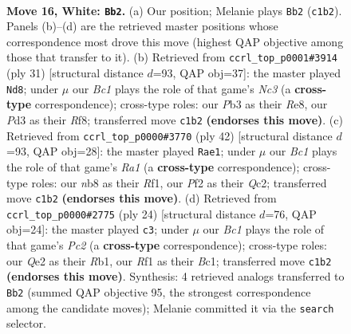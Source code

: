 \documentclass[11pt]{article}
\begin{document}
\clearpage

\begin{figure}[p]\centering
\begin{subfigure}{0.46\textwidth}\centering
\resizebox{\linewidth}{!}{%
\newchessgame
\chessboard[
  setfen={rn1q1rk1/4bp2/5np1/p6p/1p1p4/1P1P1NP1/P3QPKP/RNB2R2 w - - 0 16},
  showmover=false,
  pgfstyle=straightmove, color=movearrow, markmove={c1-b2}
]}
\caption{}
\end{subfigure}\hfill
\begin{subfigure}{0.46\textwidth}\centering
\resizebox{\linewidth}{!}{%
\newchessgame
\chessboard[
  setfen={4rr2/pbp2pkp/1pnq2pn/4p3/4P3/2PP1N1P/PP2BNP1/R1Q2RK1 b - - 2 16},
  showmover=false,
  pgfstyle=straightmove, color=movearrow, markmove={c6-d8}
]}
\caption{}
\end{subfigure}
\\[4pt]
\begin{subfigure}{0.46\textwidth}\centering
\resizebox{\linewidth}{!}{%
\newchessgame
\chessboard[
  setfen={1r3rk1/1p1bq1pp/2p2n2/p1p2p2/2P5/PP1NP1P1/2Q2PBP/R4RK1 w - - 4 22},
  showmover=false,
  pgfstyle=straightmove, color=movearrow, markmove={a1-e1}
]}
\caption{}
\end{subfigure}\hfill
\begin{subfigure}{0.46\textwidth}\centering
\resizebox{\linewidth}{!}{%
\newchessgame
\chessboard[
  setfen={2kr3r/2pnqppp/pppb4/4p3/2P1P3/3P1N2/P1P2PPP/1RBQ1RK1 w - - 0 13},
  showmover=false,
  pgfstyle=straightmove, color=movearrow, markmove={c2-c3}
]}
\caption{}
\end{subfigure}
\caption{\textbf{Move 16, White: \texttt{Bb2}.} (a) Our position; Melanie plays \texttt{Bb2} (\texttt{c1b2}). Panels (b)--(d) are the retrieved master positions whose correspondence most drove this move (highest QAP objective among those that transfer to it). (b) Retrieved from \texttt{ccrl\_top\_p0001\#3914} (ply 31) [structural distance $d$=93, QAP obj=37]: the master played \texttt{Nd8}; under $\mu$ our \emph{Bc1} plays the role of that game's \emph{Nc3} (a \textbf{cross-type} correspondence); cross-type roles: our \emph{P}b3 as their \emph{R}e8, our \emph{P}d3 as their \emph{R}f8; transferred move \texttt{c1b2} \textbf{(endorses this move)}. (c) Retrieved from \texttt{ccrl\_top\_p0000\#3770} (ply 42) [structural distance $d$=93, QAP obj=28]: the master played \texttt{Rae1}; under $\mu$ our \emph{Bc1} plays the role of that game's \emph{Ra1} (a \textbf{cross-type} correspondence); cross-type roles: our \emph{n}b8 as their \emph{R}f1, our \emph{P}f2 as their \emph{Q}c2; transferred move \texttt{c1b2} \textbf{(endorses this move)}. (d) Retrieved from \texttt{ccrl\_top\_p0000\#2775} (ply 24) [structural distance $d$=76, QAP obj=24]: the master played \texttt{c3}; under $\mu$ our \emph{Bc1} plays the role of that game's \emph{Pc2} (a \textbf{cross-type} correspondence); cross-type roles: our \emph{Q}e2 as their \emph{R}b1, our \emph{R}f1 as their \emph{B}c1; transferred move \texttt{c1b2} \textbf{(endorses this move)}. Synthesis: 4 retrieved analogs transferred to \texttt{Bb2} (summed QAP objective 95, the strongest correspondence among the candidate moves); Melanie committed it via the \texttt{search} selector.}
\label{fig:thought-m30}
\end{figure}
\end{document}
